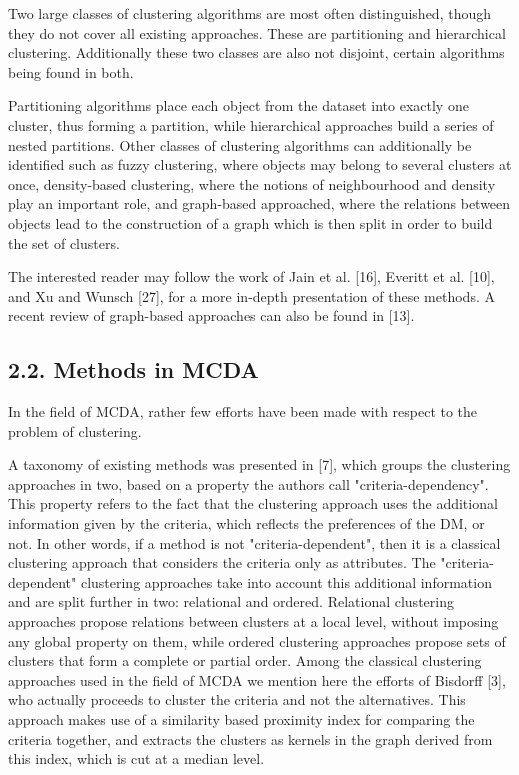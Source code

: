 \documentclass[10pt]{article}
\begin{document}
Two large classes of clustering algorithms are most often distinguished, though they do not cover all existing approaches. These are partitioning and hierarchical clustering. Additionally these two classes are also not disjoint, certain algorithms being found in both.

Partitioning algorithms place each object from the dataset into exactly one cluster, thus forming a partition, while hierarchical approaches build a series of nested partitions. Other classes of clustering algorithms can additionally be identified such as fuzzy clustering, where objects may belong to several clusters at once, density-based clustering, where the notions of neighbourhood and density play an important role, and graph-based approached, where the relations between objects lead to the construction of a graph which is then split in order to build the set of clusters.

The interested reader may follow the work of Jain et al. [16], Everitt et al. [10], and Xu and Wunsch [27], for a more in-depth presentation of these methods. A recent review of graph-based approaches can also be found in [13].

\subsection*{2.2. Methods in MCDA}
In the field of MCDA, rather few efforts have been made with respect to the problem of clustering.

A taxonomy of existing methods was presented in [7], which groups the clustering approaches in two, based on a property the authors call "criteria-dependency". This property refers to the fact that the clustering approach uses the additional information given by the criteria, which reflects the preferences of the DM, or not. In other words, if a method is not "criteria-dependent", then it is a classical clustering approach that considers the criteria only as attributes. The "criteria-dependent" clustering approaches take into account this additional information and are split further in two: relational and ordered. Relational clustering approaches propose relations between clusters at a local level, without imposing any global property on them, while ordered clustering approaches propose sets of clusters that form a complete or partial order.
Among the classical clustering approaches used in the field of MCDA we mention here the efforts of Bisdorff [3], who actually proceeds to cluster the criteria and not the alternatives. This approach makes use of a similarity based proximity index for comparing the criteria together, and extracts the clusters as kernels in the graph derived from this index, which is cut at a median level.
\end{document}
